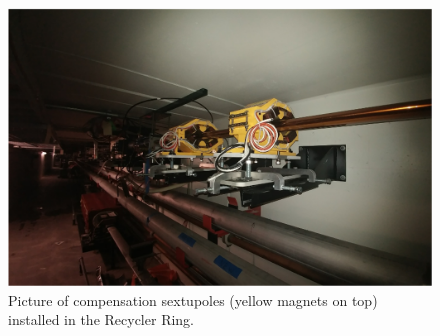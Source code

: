 \begin{figure}[H]
   \centering
   \includegraphics[width=\columnwidth]{chapter3/sextupoles.png}
   \caption{Picture of compensation sextupoles (yellow magnets on top) installed in the Recycler Ring.}
   \label{fig:sextupoles}
\end{figure}